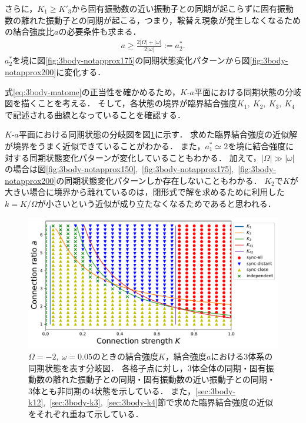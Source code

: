 \documentclass[../main]{subfiles}
\begin{document}
    さらに，$K_1\geq K'_3$から固有振動数の近い振動子との同期が起こらずに固有振動数の離れた振動子との同期が起こる，つまり，鞍替え現象が発生しなくなるための結合強度比$a$の必要条件も求まる．
    \begin{align}
        \label{eq:a-ast2}
        a\geq \frac{2|\Omega|+|\omega|}{2|\omega|}:=a^\ast_2.    
    \end{align}
    $a^\ast_2$を境に図\ref{fig:3body-notapprox175}の同期状態変化パターンから図\ref{fig:3body-notapprox200}に変化する．

    式\eqref{eq:3body-matome}の正当性を確かめるため，$K$-$a$平面における同期状態の分岐図を描くことを考える．
    そして，各状態の境界が臨界結合強度$K_1,\ K_2,\ K_3,\ K_4$で記述される曲線となっていることを確認する．

    $K$-$a$平面における同期状態の分岐図を図\ref{fig:3body-phase}に示す．
    求めた臨界結合強度の近似解が境界をうまく近似できていることがわかる．
    また，$a^\ast_1\simeq 2$を境に結合強度に対する同期状態変化パターンが変化していることもわかる．
    加えて，$|\Omega|\gg|\omega|$の場合は図\ref{fig:3body-notapprox150},\ \ref{fig:3body-notapprox175},\ \ref{fig:3body-notapprox200}の同期状態変化パターンしか存在しないこともわかる．
    $K_2$で$K$が大きい場合に境界から離れているのは，閉形式で解を求めるために利用した$k=K/\Omega$が小さいという近似が成り立たなくなるためであると思われる．
    \begin{figure}[tbp]
    \centering
    \includegraphics[width=135mm]{images/three-body-phase.pdf}
    \centering
    \caption{$\Omega=-2,\ \omega=0.05$のときの結合強度$K$，結合強度$a$における3体系の同期状態を表す分岐図．
    各格子点に対し，3体全体の同期・固有振動数の離れた振動子との同期・固有振動数の近い振動子との同期・3体とも非同期の4状態を示している．
    また，\ref{sec:3body-k12},\ \ref{sec:3body-k3},\ \ref{sec:3body-k4}節で求めた臨界結合強度の近似をそれぞれ重ねて示している．
    }
    \label{fig:3body-phase}
    \end{figure}
\end{document}
